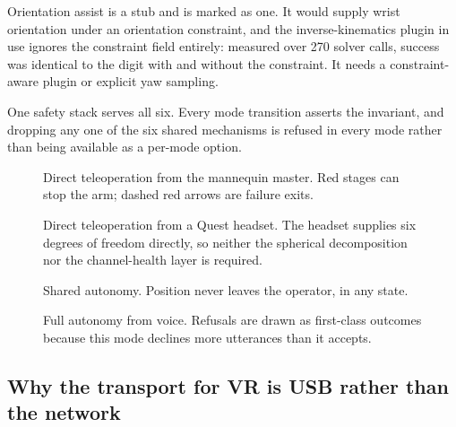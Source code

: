 Orientation assist is a stub and is marked as one. It would supply wrist
orientation under an orientation constraint, and the inverse-kinematics plugin
in use ignores the constraint field entirely: measured over 270 solver calls,
success was identical to the digit with and without the constraint. It needs a
constraint-aware plugin or explicit yaw sampling.

One safety stack serves all six. Every mode transition asserts the invariant,
and dropping any one of the six shared mechanisms is refused in every mode
rather than being available as a per-mode option.

\begin{figure}
  \centering
  \resizebox{\textheight}{!}{}
  \caption[Data path: direct teleoperation from the mannequin]{Direct
  teleoperation from the mannequin master. Red stages can stop the arm; dashed
  red arrows are failure exits.}
  \label{fig:mode1}
\end{figure}

\begin{figure}
  \centering
  \resizebox{\textheight}{!}{}
  \caption[Data path: direct teleoperation from VR]{Direct teleoperation from
  a Quest headset. The headset supplies six degrees of freedom directly, so
  neither the spherical decomposition nor the channel-health layer is
  required.}
  \label{fig:mode2}
\end{figure}

\begin{figure}
  \centering
  \resizebox{\textheight}{!}{}
  \caption[Data path: shared autonomy]{Shared autonomy. Position never leaves
  the operator, in any state.}
  \label{fig:mode3}
\end{figure}

\begin{figure}
  \centering
  \resizebox{\textheight}{!}{}
  \caption[Data path: full autonomy from voice]{Full autonomy from voice.
  Refusals are drawn as first-class outcomes because this mode declines more
  utterances than it accepts.}
  \label{fig:mode4}
\end{figure}

\subsection{Why the transport for VR is USB rather than the network}

